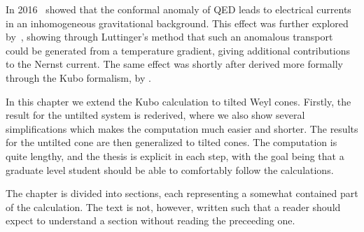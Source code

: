 In 2016~\textcite{chernodubAnomalousTransportDue2016} showed that the conformal anomaly of QED leads to electrical currents in an inhomogeneous gravitational background.
This effect was further explored by~\textcite{chernodubGenerationNernstCurrent2018}, showing through Luttinger's method that such an anomalous transport could be generated from a temperature gradient, giving additional contributions to the Nernst current.
The same effect was shortly after derived more formally through the Kubo formalism, by \textcite{arjonaFingerprintsConformalAnomaly2019}.

In this chapter we extend the Kubo calculation to tilted Weyl cones.
Firstly, the result for the untilted system is rederived, where we also show several simplifications which makes the computation much easier and shorter.
The results for the untilted cone are then generalized to tilted cones.
The computation is quite lengthy, and the thesis is explicit in each step, with the goal being that a graduate level student should be able to comfortably follow the calculations.

The chapter is divided into sections, each representing a somewhat contained part of the calculation.
The text is not, however, written such that a reader should expect to understand a section without reading the preceeding one.

